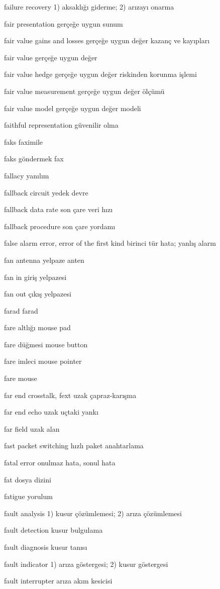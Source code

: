 \documentclass[12pt,fleqn]{article}\usepackage{../../common}
\begin{document}
failure recovery 1) aksaklığı giderme; 2) arızayı onarma

fair presentation gerçeğe uygun sunum

fair value gains and losses gerçeğe uygun değer kazanç ve kayıpları

fair value gerçeğe uygun değer

fair value hedge gerçeğe uygun değer riskinden korunma işlemi

fair value measurement gerçeğe uygun değer ölçümü

fair value model gerçeğe uygun değer modeli

faithful representation güvenilir olma

faks faximile

faks göndermek fax

fallacy yanılım

fallback circuit yedek devre

fallback data rate son çare veri hızı

fallback procedure son çare yordamı

false alarm error, error of the first kind birinci tür hata; yanlış alarm

fan antenna yelpaze anten

fan in giriş yelpazesi

fan out çıkış yelpazesi

farad farad

fare altlığı mouse pad

fare düğmesi mouse button

fare imleci mouse pointer

fare mouse

far end crosstalk, fext uzak çapraz-karışma

far end echo uzak uçtaki yankı

far field uzak alan

fast packet switching hızlı paket anahtarlama

fatal error onulmaz hata, sonul hata

fat dosya dizini

fatigue yorulum

fault analysis 1) kusur çözümlemesi; 2) arıza çözümlemesi

fault detection kusur bulgulama

fault diagnosis kusur tanısı

fault indicator 1) arıza göstergesi; 2) kusur göstergesi

fault interrupter arıza akım kesicisi
\end{document}
